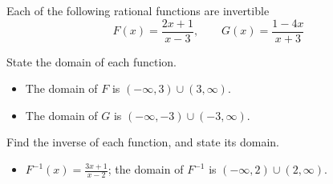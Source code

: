 \begin{exercises}
\begin{problem}
\begin{multicols}{4}
\begin{subproblem}
\begin{shortsolution}
    \end{shortsolution}
\end{subproblem}
\end{multicols}
\end{problem}
\begin{problem}
 Each of the following rational functions are invertible 
\[
F(x)=\frac{2x+1}{x-3}, \qquad G(x)= \frac{1-4x}{x+3}
\]
\begin{subproblem}
State the domain of each function. 
        \begin{shortsolution}
         \begin{itemize}
          \item The domain of $F$ is $(-\infty,3)\cup(3,\infty)$.
          \item The domain of $G$ is $(-\infty,-3)\cup(-3,\infty)$.
         \end{itemize}
        \end{shortsolution}
\end{subproblem}
\begin{subproblem}
Find the inverse of each function, and state its domain.
        \begin{shortsolution}
         \begin{itemize}
          \item $F^{-1}(x)=\frac{3x+1}{x-2}$; the domain of $F^{-1}$ is $(-\infty,2)\cup(2,\infty)$.

\end{itemize}
\end{shortsolution}
\end{subproblem}
\end{problem}
\end{exercises}
